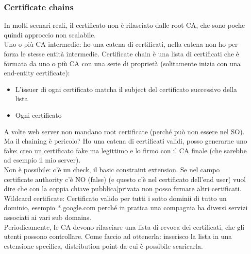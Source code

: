 \documentclass[16px]{article}
\begin{document}
\subsubsection{Certificate chains}
In molti scenari reali, il certificato non è rilasciato dalle root CA, che sono poche quindi approccio non scalabile.\\ Uno o più CA intermedie:  ho una catena di certificati, nella catena non ho per forza le stesse entità intermedie. Certificate chain è una lista di certificati che è formata da uno o più CA con una serie di proprietà (solitamente  inizia con una end-entity certificate):
\begin{itemize}
\item L'issuer di ogni certificato matcha il subject del certificato successivo della lista
\item Ogni certificato 
\end{itemize}
A volte web server non mandano root certificate (perché può non essere nel SO).\\ Ma il chaining è pericolo? Ho una catena di certificati validi, posso generarne uno fake: creo un certificato fake ma legittimo e lo firmo con il CA finale (che sarebbe ad esempio il mio server).\\ Non è possibile: c'è un check, il basic constraint extension. Se nel campo certificate authority c'è NO (false) (e questo c'è nel certificato dell'end user) vuol dire che con la coppia chiave pubblica$|$privata non posso firmare altri certificati.
\\Wildcard certificate:
Certificato valido per tutti i sotto dominii di tutto un dominio, esempio *.google.com perché in pratica una compagnia ha diversi servizi associati ai vari sub domains.\\ Periodicamente, le CA devono rilasciare una lista di revoca dei certificati, che gli utenti possono controllare. Come faccio ad ottenerla: inserisco la lista in una estensione specifica, distribution point da cui è possibile scaricarla.
\end{document}
